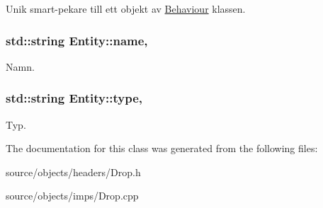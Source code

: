 Unik smart-\/pekare till ett objekt av \hyperlink{classBehaviour}{Behaviour} klassen. 

\hypertarget{classEntity_a931b21fbdebb1a5963b4bcab5df128f5}{
\subsubsection[{name}]{\setlength{\rightskip}{0pt plus 5cm}std\+::string Entity\+::name\hspace{0.3cm}{\ttfamily [protected]}, {\ttfamily [inherited]}}}\label{classEntity_a931b21fbdebb1a5963b4bcab5df128f5}


Namn. 

\hypertarget{classEntity_a298a9ebf2474bb00874b5ff6a0d637ef}{
\subsubsection[{type}]{\setlength{\rightskip}{0pt plus 5cm}std\+::string Entity\+::type\hspace{0.3cm}{\ttfamily [protected]}, {\ttfamily [inherited]}}}\label{classEntity_a298a9ebf2474bb00874b5ff6a0d637ef}


Typ. 



The documentation for this class was generated from the following files\+:\begin{DoxyCompactItemize}
\item 
source/objects/headers/Drop.\+h\item 
source/objects/imps/Drop.\+cpp\end{DoxyCompactItemize}
